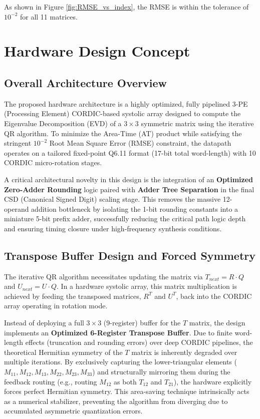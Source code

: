 \documentclass[11pt, a4paper]{article}
\begin{document}
As shown in Figure \ref{fig:RMSE_vs_index}, the RMSE is within the tolerance of $10^{-2}$ for all 11 matrices.

\section{Hardware Design Concept}

\subsection{Overall Architecture Overview}
The proposed hardware architecture is a highly optimized, fully pipelined 3-PE (Processing Element) CORDIC-based systolic array designed to compute the Eigenvalue Decomposition (EVD) of a $3 \times 3$ symmetric matrix using the iterative QR algorithm. To minimize the Area-Time (AT) product while satisfying the stringent $10^{-2}$ Root Mean Square Error (RMSE) constraint, the datapath operates on a tailored fixed-point Q6.11 format (17-bit total word-length) with 10 CORDIC micro-rotation stages.

A critical architectural novelty in this design is the integration of an \textbf{Optimized Zero-Adder Rounding} logic paired with \textbf{Adder Tree Separation} in the final CSD (Canonical Signed Digit) scaling stage. This removes the massive 12-operand addition bottleneck by isolating the 1-bit rounding constants into a miniature 5-bit prefix adder, successfully reducing the critical path logic depth and ensuring timing closure under high-frequency synthesis conditions.

\subsection{Transpose Buffer Design and Forced Symmetry}
The iterative QR algorithm necessitates updating the matrix via $T_{next} = R \cdot Q$ and $U_{next} = U \cdot Q$. In a hardware systolic array, this matrix multiplication is achieved by feeding the transposed matrices, $R^T$ and $U^T$, back into the CORDIC array operating in rotation mode. 

Instead of deploying a full $3 \times 3$ (9-register) buffer for the $T$ matrix, the design implements an \textbf{Optimized 6-Register Transpose Buffer}. Due to finite word-length effects (truncation and rounding errors) over deep CORDIC pipelines, the theoretical Hermitian symmetry of the $T$ matrix is inherently degraded over multiple iterations. By exclusively capturing the lower-triangular elements ($M_{11}, M_{12}, M_{13}, M_{22}, M_{23}, M_{33}$) and structurally mirroring them during the feedback routing (e.g., routing $M_{12}$ as both $T_{12}$ and $T_{21}$), the hardware explicitly forces perfect Hermitian symmetry. This area-saving technique intrinsically acts as a numerical stabilizer, preventing the algorithm from diverging due to accumulated asymmetric quantization errors.
\end{document}
